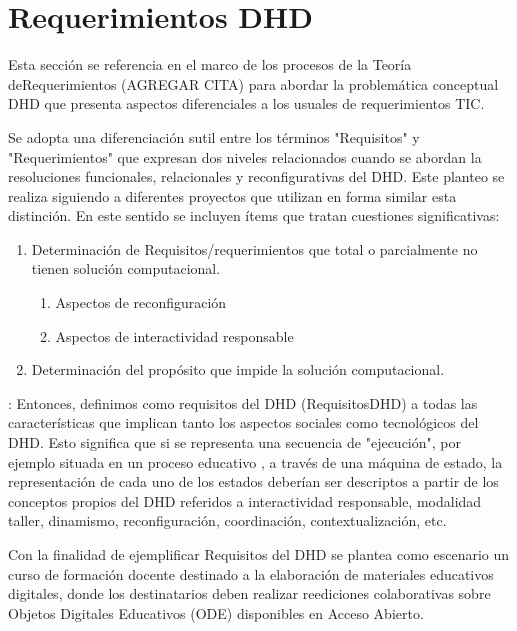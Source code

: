 \section{Requerimientos DHD} \label{requerimientosdhd}

Esta sección se referencia en el marco de los procesos de la Teoría    
deRequerimientos (AGREGAR CITA) para abordar la problemática conceptual DHD que
presenta aspectos diferenciales a los usuales de requerimientos TIC. 

Se adopta una diferenciación sutil entre los términos "Requisitos" y "Requerimientos" que expresan dos
niveles relacionados cuando se abordan la resoluciones funcionales,
relacionales y reconfigurativas del DHD. Este planteo se realiza siguiendo a diferentes
proyectos \cite{requerimiento1,requerimiento2,requerimiento3,requerimiento4} que
utilizan en forma similar esta distinción.
En este sentido se incluyen ítems que tratan cuestiones
significativas: 

\begin{enumerate} \label{requerimientositems}
 \item  Determinación de Requisitos/requerimientos que total o parcialmente
no tienen solución computacional.
 
 \begin{enumerate}
 \item Aspectos de reconfiguración 
 \item Aspectos de interactividad responsable 
 \end{enumerate}
\item Determinación del propósito que impide la solución computacional.

\end{enumerate}

\begin{defi} : 
Entonces, definimos como requisitos del DHD (RequisitosDHD) a
todas las características que implican tanto los aspectos sociales como tecnológicos del
DHD. Esto significa que si se representa una secuencia de "ejecución", por
ejemplo situada en un proceso educativo \cite{cacic2007}, a través de una
máquina de estado, la representación de cada uno de los estados deberían ser
descriptos a partir de los conceptos propios del DHD referidos a interactividad responsable, modalidad taller, dinamismo, reconfiguración,
coordinación, contextualización, etc.
\end{defi} \label{requisito}

Con la finalidad de ejemplificar Requisitos del DHD se plantea como escenario un curso de formación docente destinado a la elaboración de materiales educativos digitales, donde los destinatarios deben realizar reediciones colaborativas sobre Objetos Digitales Educativos (ODE) disponibles en Acceso Abierto.

